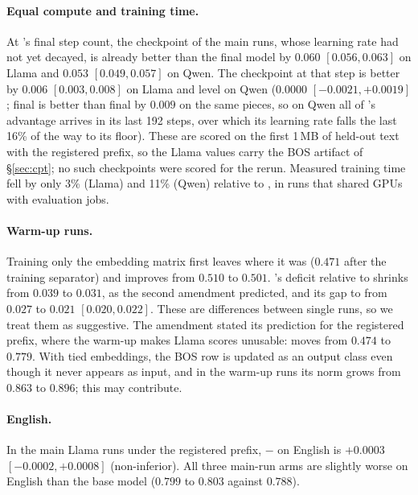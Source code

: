 

\paragraph{Equal compute and training time.} At \RII{}'s final step count, the \RO{} checkpoint of the main runs, whose learning rate had not yet decayed, is already better than the final \RII{} model by $0.060$ $[0.056, 0.063]$ on Llama and $0.053$ $[0.049, 0.057]$ on Qwen. The \RI{} checkpoint at that step is better by $0.006$ $[0.003, 0.008]$ on Llama and level on Qwen ($0.0000$ $[-0.0021, +0.0019]$; final \RI{} is better than final \RII{} by $0.009$ on the same pieces, so on Qwen all of \RI{}'s advantage arrives in its last 192 steps, over which its learning rate falls the last 16\% of the way to its floor). These are scored on the first 1\,MB of held-out text with the registered prefix, so the Llama values carry the BOS artifact of \S\ref{sec:cpt}; no such checkpoints were scored for the rerun. Measured training time fell by only 3\% (Llama) and 11\% (Qwen) relative to \RI{}, in runs that shared GPUs with evaluation jobs.

\paragraph{Warm-up runs.} Training only the embedding matrix first leaves \RO{} where it was ($0.471$ after the training separator) and improves \RII{} from $0.510$ to $0.501$. \RII{}'s deficit relative to \RO{} shrinks from $0.039$ to $0.031$, as the second amendment predicted, and its gap to \RI{} from $0.027$ to $0.021$ $[0.020, 0.022]$. These are differences between single runs, so we treat them as suggestive. The amendment stated its prediction for the registered prefix, where the warm-up makes Llama scores unusable: \RO{} moves from $0.474$ to $0.779$. With tied embeddings, the BOS row is updated as an output class even though it never appears as input, and in the warm-up runs its norm grows from $0.863$ to $0.896$; this may contribute.

\paragraph{English.} In the main Llama runs under the registered prefix, \RII{} $-$ \RO{} on English is $+0.0003$ $[-0.0002, +0.0008]$ (non-inferior). All three main-run arms are slightly worse on English than the base model ($0.799$ to $0.803$ against $0.788$).

